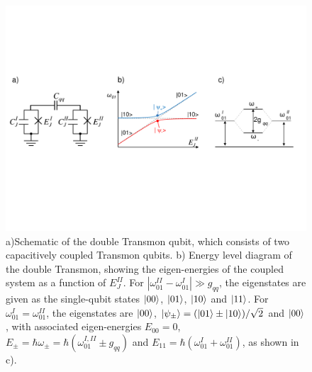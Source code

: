 \begin{figure}[ht!]
	\centering
	\includegraphics[width=\textwidth]{./material/figures/scalable-architecture/double_transmon_schematic}
	\caption[...]{a)Schematic of the double Transmon qubit, which consists of two capacitively coupled Transmon qubits. b) Energy level diagram of the double Transmon, showing the eigen-energies of the coupled system as a function of $E_J^{II}$. For $|\omega_{01}^{II}-\omega_{01}^{I}|\gg g_{qq}$, the eigenstates are given as the single-qubit states $\left| 00 \right>$, $\left| 01 \right>$, $\left| 10 \right>$ and $\left| 11 \right>$. For $\omega_{01}^I = \omega_{01}^{II}$, the eigenstates are $\left| 00 \right>$, $\left| \psi_\pm \right>=(\left| 01 \right>\pm\left| 10 \right>)/\sqrt{2}$ and $\left| 00 \right>$, with associated eigen-energies $E_{00}=0$, $E_\pm = \hbar\omega_\pm = \hbar(\omega_{01}^{I,II}\pm g_{qq})$ and $E_{11}=\hbar(\omega_{01}^I+\omega_{01}^{II})$, as shown in c).}
	\label{fig:qubit_molecule_schematic}
\end{figure}

